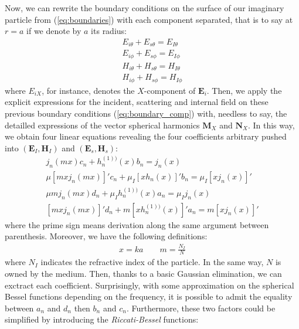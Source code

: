 \documentclass{article}
\numberwithin{equation}{section}
\begin{document}
Now, we can rewrite the boundary conditions on the surface of our imaginary particle from (\ref{eq:boundaries}) with each component separated, that is to say at $r=a$ if we denote by $a$ its radius:
\begin{equation}\label{eq:boundary_comp}
\begin{aligned}
E_{i\theta} + E_{s\theta} = E_{I\theta}\\
E_{i\phi} + E_{s\phi} = E_{I\phi}\\
H_{i\theta} + H_{s\theta} = H_{I\theta}\\
H_{i\phi} + H_{s\phi} = H_{I\phi}
\end{aligned}
\end{equation}
where $E_{iX}$, for instance, denotes the $X$-component of $\textbf{E}_{i}$. Then, we apply the explicit expressions for the incident, scattering and internal field on these previous boundary conditions (\ref{eq:boundary_comp}) with, needless to say, the detailled expressions of the vector spherical harmonics $\textbf{M}_{X}$ and $\textbf{N}_{X}$. In this way, we obtain four linear equations revealing the four coefficients arbitrary pushed into $(\textbf{E}_{I}, \textbf{H}_{I})$ and $(\textbf{E}_{s}, \textbf{H}_{s})$:
\begin{equation}
\begin{aligned}
j_{n}(mx)c_{n} + h^{(1))}_{n}(x)b_{n} = j_{n}(x) \\
\mu[mxj_{n}(mx)]'c_{n} + \mu_{I}[xh_{n}(x)]'b_{n} = \mu_{I}[xj_{n}(x)]' \\
\mu mj_{n}(mx)d_{n} + \mu_{I}h^{(1))}_{n}(x)a_{n} = \mu_{I}j_{n}(x) \\
[mxj_{n}(mx)]'d_{n}+m[xh^{(1))}_{n}(x)]'a_{n} = m[xj_{n}(x)]'
\end{aligned}
\end{equation}
where the prime sign means derivation along the same argument between parenthesis. Moreover, we have the following definitions:
\begin{equation}
\begin{aligned}
x = ka \qquad m = \frac{N_{I}}{N}
\end{aligned}
\end{equation}
where $N_{I}$ indicates the refractive index of the particle. In the same way, $N$ is owned by the medium. Then, thanks to a basic Gaussian elimination, we can exctract each coefficient. Surprisingly, with some approximation on the spherical Bessel functions depending on the frequency, it is possible to admit the equality between $a_{n}$ and $d_{n}$ then $b_{n}$ and $c_{n}$. Furthermore, these two factors could be simplified by introducing the \textit{Riccati-Bessel} functions:
\end{document}
